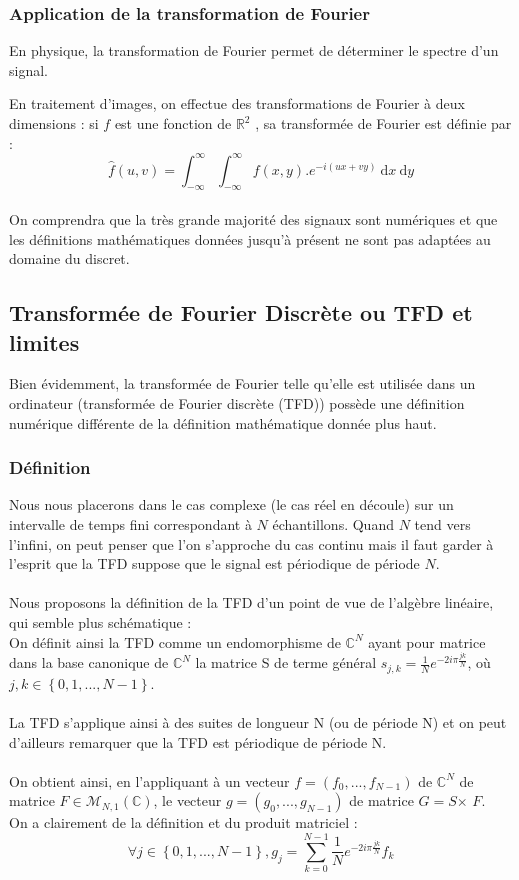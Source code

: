 \subsubsection{Application de la transformation de Fourier}
En physique, la transformation de Fourier permet de déterminer le spectre d'un signal. 

En traitement d'images, on effectue des transformations de Fourier à deux dimensions : si $f$ est une fonction de $\mathbb{R}^2$ , sa transformée de Fourier est définie par : $$\hat{f}(u,v)=\int_{-\infty}^{\infty}\int_{-\infty}^{\infty}f(x,y).e^{-i(ux+vy)}\:\mathrm{d}x\:\mathrm{d}y$$
\\
On comprendra que la très grande majorité des signaux sont numériques et que les définitions mathématiques données jusqu'à présent ne sont pas adaptées au domaine du discret.

\subsection{Transformée de Fourier Discrète ou TFD et limites}

Bien évidemment, la transformée de Fourier telle qu'elle est utilisée dans un ordinateur (transformée de Fourier discrète (TFD)) possède une définition numérique différente de la définition mathématique donnée plus haut. 

\subsubsection{Définition}

Nous nous placerons dans le cas complexe (le cas réel en découle) sur un intervalle de temps fini correspondant à $N$ échantillons. Quand $N$ tend vers l'infini, on peut penser que l'on s'approche du cas continu mais il faut garder à l'esprit que la TFD suppose que le signal est périodique de période $N$.
\\ \\
Nous proposons la définition de la TFD d'un point de vue de l'algèbre linéaire, qui semble plus schématique :
\\
On définit ainsi la TFD comme un endomorphisme de $\mathbb{C}^N$ ayant pour matrice dans la base canonique de $\mathbb{C}^N$ la matrice S de terme général $s_{j,k}=\displaystyle{\frac{1}{N}e^{-2i\pi \frac{jk}{N}}}$, où $j,k\in \left\{0,1,...,N-1\right\}$. 
\\ \\
La TFD s'applique ainsi à des suites de longueur N (ou de période N) et on peut d'ailleurs remarquer que la TFD est périodique de période N.
\\ \\
On obtient ainsi, en l'appliquant à un vecteur $f=(f_0,...,f_{N-1})$ de $\mathbb{C}^N$ de matrice $F\in \mathcal{M}_{N,1}(\mathbb{C})$, le vecteur $g=(g_0,...,g_{N-1})$ de matrice $G=S$$\times$ $F$.
\\ On a clairement de la définition et du produit matriciel : 
$$\forall j\in \left\{0,1,...,N-1\right\}, g_j=\displaystyle\sum_{k=0}^{N-1}\displaystyle{\frac{1}{N}e^{-2i\pi \frac{jk}{N}}}f_k$$

